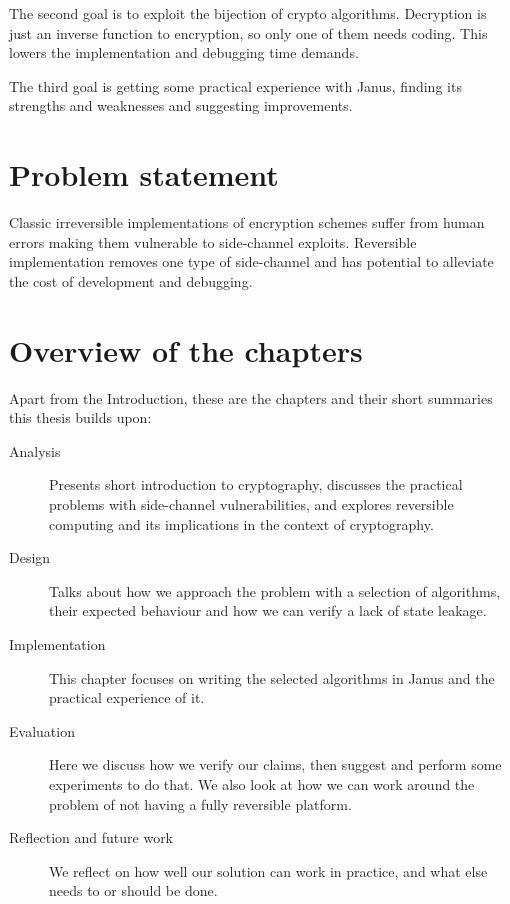 \documentclass[a4paper,10pt,openright]{memoir}
\begin{document}
The second goal is to exploit the bijection of crypto algorithms. 
Decryption is just an inverse function to encryption, so only one of them 
needs coding. This lowers the implementation and debugging time demands.

The third goal is getting some practical experience with Janus, finding 
its strengths and weaknesses and suggesting improvements.

\section{Problem statement}

Classic irreversible implementations of encryption schemes suffer from 
human errors making them vulnerable to side-channel exploits. 
Reversible implementation removes one type of side-channel and has 
potential to alleviate the cost of development and debugging.

\section{Overview of the chapters}

Apart from the Introduction, these are the chapters and their short 
summaries this thesis builds upon:

\begin{description}

\item[Analysis] Presents short introduction to cryptography, discusses 
the practical problems with side-channel vulnerabilities, and explores 
reversible computing and its implications in the context of 
cryptography.

\item[Design] Talks about how we approach the problem with a selection 
of algorithms, their expected behaviour and how we can verify a lack of 
state leakage.

\item[Implementation] This chapter focuses on writing the selected 
algorithms in Janus and the practical experience of it.

\item[Evaluation] Here we discuss how we verify our claims, then 
suggest and perform some experiments to do that. We also look at how we 
can work around the problem of not having a fully reversible platform.

\item[Reflection and future work] We reflect on how well our solution 
can work in practice, and what else needs to or should be done.

\end{description}
\end{document}
